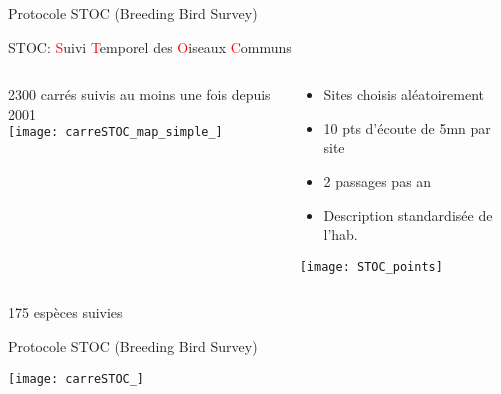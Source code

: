 \documentclass[10pt]{beamer}
\begin{document}
\begin{frame}{Protocole STOC (Breeding Bird Survey)}
  \begin{center}
    STOC: \textcolor{red}{S}uivi \textcolor{red}{T}emporel des \textcolor{red}{O}iseaux \textcolor{red}{C}ommuns
  \end{center}
  \begin{columns}[c]
    \begin{column}[c]{0.5\textwidth}
      \begin{center}
        2300 carrés suivis au moins une fois depuis 2001 \\
        \texttt{[image: carreSTOC\_map\_simple\_]}
      \end{center}
    \end{column}
    \begin{column}[c]{0.5\textwidth}
      \begin{small}
        \begin{itemize}
        \item  Sites choisis aléatoirement
        \item 10 pts d'écoute de 5mn par site
        \item 2 passages pas an
        \item Description standardisée de l'hab.
        \end{itemize}
      \end{small}
      \begin{center}
        \texttt{[image: STOC\_points]}
      \end{center}
    \end{column}
  \end{columns}
  \begin{center}
    175 espèces suivies
  \end{center}
\end{frame}


\begin{frame}{Protocole STOC (Breeding Bird Survey)}
  \begin{center}
    \texttt{[image: carreSTOC\_]}
  \end{center}
\end{frame}
\end{document}
